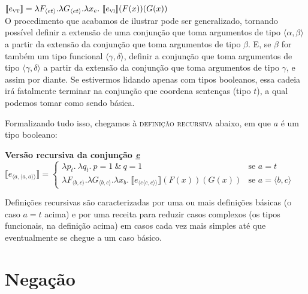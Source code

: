 \n $\llbracket e_{\text{\textsc{vt}}}\rrbracket = \lambda
F_{\langle et\rangle}.\lambda G_{\langle et\rangle}.\lambda
x_{e}.\
\llbracket e_{\text{\textsc{vi}}}\rrbracket (F(x))(G(x))$\\

\n O procedimento que acabamos de ilustrar pode ser generalizado, tornando possível definir a
extensão de uma conjunção que toma argumentos de tipo $\langle
\alpha,\beta\rangle$ a partir da extensão da conjunção que toma
argumentos de tipo $\beta$. E, se $\beta$ for também um tipo
funcional $\langle\gamma,\delta\rangle$, definir a conjunção que
toma argumentos de tipo $\langle\gamma,\delta\rangle$ a partir da
extensão da conjunção que toma argumentos de tipo $\gamma$, e
assim por diante. Se estivermos lidando apenas com tipos
booleanos, essa cadeia irá fatalmente terminar na conjunção que
coordena sentenças (tipo $t$), a qual podemos tomar como
sendo básica.

Formalizando tudo isso, chegamos à \textsc{definição
recursiva} abaixo, em que $a$ é um tipo booleano: \\

\begin{tcolorbox}[boxrule=0pt,sharp corners]
	
	\textbf{Versão recursiva da conjunção \underline{\textit{e}}}\\
	
	$\llbracket e_{\langle a ,\langle
		a,a\rangle\rangle}\rrbracket =
	\begin{cases}
	\lambda p_{t}.\ \lambda q_{t}.\ p=1\ \&\ q=1\ & \text{se } a =
	t\\
	\lambda F_{\langle b,c\rangle}.\lambda G_{\langle b,c\rangle}.\lambda x_{b}.\ \llbracket
	e_{\langle c\langle c,c\rangle\rangle}\rrbracket (F(x))(G(x)) &
	\text{se } a = \langle b,c\rangle
	\end{cases}$
	
	
\end{tcolorbox}

\bigskip

Definições recursivas são caracterizadas por uma ou mais definições básicas (o caso $a=t$ acima) e por uma receita para reduzir casos complexos (os tipos funcionais, na definição acima) em casos cada vez mais simples até que eventualmente se chegue a um caso básico. 

\section{Negação}

